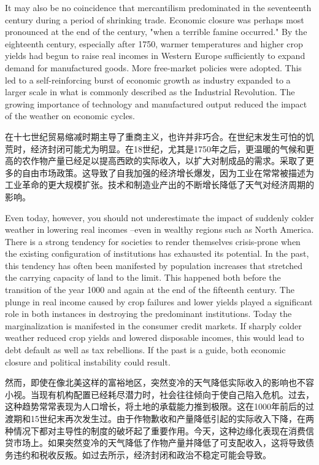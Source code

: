 \begin{Parallel}{97mm}{72mm}
  \ParallelLText
  {It may also be no coincidence that mercantilism predominated in the seventeenth century during a period of shrinking trade. Economic closure was perhaps most pronounced at the end of the century, "when a terrible famine occurred." By the eighteenth century, especially after 1750, warmer temperatures and higher crop yields had begun to raise real incomes in Western Europe sufficiently to expand demand for manufactured goods. More free-market policies were adopted. This led to a self-reinforcing burst of economic growth as industry expanded to a larger scale in what is commonly described as the Industrial Revolution. The growing importance of technology and manufactured output reduced the impact of the weather on economic cycles.}
  
  \ParallelRText
  {在十七世纪贸易缩减时期主导了重商主义，也许并非巧合。在世纪末发生可怕的饥荒时，经济封闭可能尤为明显。在18世纪，尤其是1750年之后，更温暖的气候和更高的农作物产量已经足以提高西欧的实际收入，以扩大对制成品的需求。采取了更多的自由市场政策。这导致了自我加强的经济增长爆发，因为工业在常常被描述为工业革命的更大规模扩张。技术和制造业产出的不断增长降低了天气对经济周期的影响。}
  \ParallelPar


  \ParallelLText
  {Even today, however, you should not underestimate the impact of suddenly colder weather in lowering real incomes --even in wealthy regions such as North America. There is a strong tendency for societies to render themselves crisis-prone when the existing configuration of institutions has exhausted its potential. In the past, this tendency has often been manifested by population increases that stretched the carrying capacity of land to the limit. This happened both before the transition of the year 1000 and again at the end of the fifteenth century. The plunge in real income caused by crop failures and lower yields played a significant role in both instances in destroying the predominant institutions. Today the marginalization is manifested in the consumer credit markets. If sharply colder weather reduced crop yields and lowered disposable incomes, this would lead to debt default as well as tax rebellions. If the past is a guide, both economic closure and political instability could result.}
  
  \ParallelRText
  {然而，即使在像北美这样的富裕地区，突然变冷的天气降低实际收入的影响也不容小视。当现有机构配置已经耗尽潜力时，社会往往倾向于使自己陷入危机。过去，这种趋势常常表现为人口增长，将土地的承载能力推到极限。这在1000年前后的过渡期和15世纪末再次发生过。由于作物歉收和产量降低引起的实际收入下降，在两种情况下都对主导性的制度的破坏起了重要作用。今天，这种边缘化表现在消费信贷市场上。如果突然变冷的天气降低了作物产量并降低了可支配收入，这将导致债务违约和税收反叛。如过去所示，经济封闭和政治不稳定可能会导致。}
  \ParallelPar



\end{Parallel}
